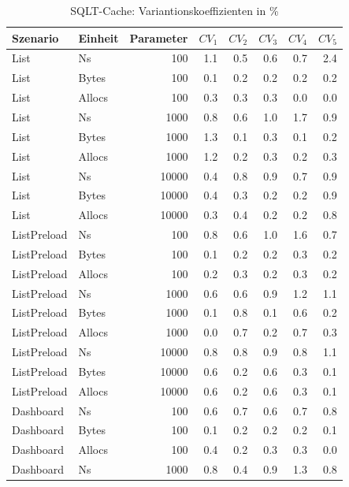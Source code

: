 
\begin{table}[ht]
\setlength{\extrarowheight}{-1pt}
\centering
\caption{SQLT-Cache: Variantionskoeffizienten in \%}
\begin{tabular}{llrrrrrr}
\toprule
Szenario & Einheit & Parameter & ${CV_1}$ & ${CV_2}$ & ${CV_3}$& ${CV_4}$ & ${CV_5}$ \\
\midrule
	List & Ns & 100 &  1.1 &  0.5 &  0.6 &  0.7 & \cellcolor{red!11}  2.4 \\
	List & Bytes & 100 &  0.1 &  0.2 &  0.2 &  0.2 &  0.2 \\
	List & Allocs & 100 &  0.3 &  0.3 &  0.3 &  0.0 &  0.0 \\
	List & Ns & 1000 &  0.8 &  0.6 &  1.0 &  1.7 &  0.9 \\
	List & Bytes & 1000 &  1.3 &  0.1 &  0.3 &  0.1 &  0.2 \\
	List & Allocs & 1000 &  1.2 &  0.2 &  0.3 &  0.2 &  0.3 \\
	List & Ns & 10000 &  0.4 &  0.8 &  0.9 &  0.7 &  0.9 \\
	List & Bytes & 10000 &  0.4 &  0.3 &  0.2 &  0.2 &  0.9 \\
	List & Allocs & 10000 &  0.3 &  0.4 &  0.2 &  0.2 &  0.8 \\
	ListPreload & Ns & 100 &  0.8 &  0.6 &  1.0 &  1.6 &  0.7 \\
	ListPreload & Bytes & 100 &  0.1 &  0.2 &  0.2 &  0.3 &  0.2 \\
	ListPreload & Allocs & 100 &  0.2 &  0.3 &  0.2 &  0.3 &  0.2 \\
	ListPreload & Ns & 1000 &  0.6 &  0.6 &  0.9 &  1.2 &  1.1 \\
	ListPreload & Bytes & 1000 &  0.1 &  0.8 &  0.1 &  0.6 &  0.2 \\
	ListPreload & Allocs & 1000 &  0.0 &  0.7 &  0.2 &  0.7 &  0.3 \\
	ListPreload & Ns & 10000 &  0.8 &  0.8 &  0.9 &  0.8 &  1.1 \\
	ListPreload & Bytes & 10000 &  0.6 &  0.2 &  0.6 &  0.3 &  0.1 \\
	ListPreload & Allocs & 10000 &  0.6 &  0.2 &  0.6 &  0.3 &  0.1 \\
	Dashboard & Ns & 100 &  0.6 &  0.7 &  0.6 &  0.7 &  0.8 \\
	Dashboard & Bytes & 100 &  0.1 &  0.2 &  0.2 &  0.2 &  0.1 \\
	Dashboard & Allocs & 100 &  0.4 &  0.2 &  0.3 &  0.3 &  0.0 \\
	Dashboard & Ns & 1000 &  0.8 &  0.4 &  0.9 &  1.3 &  0.8 \\

\end{tabular}
\end{table}
